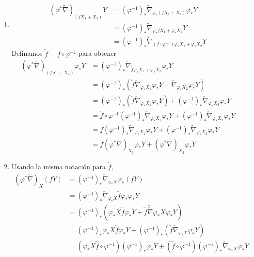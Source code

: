\documentclass[11pt]{article}
\begin{document}
\begin{enumerate}
    \item 
    \begin{align*}        (\varphi^*\widetilde{\nabla})_{(fX_1+X_2)}Y&=(\varphi^{-1})_*\widetilde{\nabla}_{\varphi_*(fX_1+X_2)}\varphi_*Y\\
     &=(\varphi^{-1})_*\widetilde{\nabla}_{\varphi_*fX_1+\varphi_*X_2}Y\\
     &=(\varphi^{-1})_*\widetilde{\nabla}_{(f\circ\varphi^{-1})\varphi_*X_1+\varphi_*X_2}Y
    \end{align*}
    Definamos $\tilde{f}=f\circ\varphi^{-1}$ para obtener
    \begin{align*}        (\varphi^*\widetilde{\nabla})_{(fX_1+X_2)}\varphi_*Y&=(\varphi^{-1})_*\widetilde{\nabla}_{\tilde{f}\varphi_*X_1+\varphi_*X_2}\varphi_*Y\\
    &=(\varphi^{-1})_*(\tilde{f}\widetilde{\nabla}_{\varphi_*X_1}\varphi_*Y+\widetilde{\nabla}_{\varphi_*X_2}\varphi_*Y)\\
    &=(\varphi^{-1})_*(\tilde{f}\widetilde{\nabla}_{\varphi_*X_1}\varphi_*Y)+(\varphi^{-1})_*\widetilde{\nabla}_{\varphi_*X_2}\varphi_*Y\\
    &=\tilde{f}\circ\varphi^{-1}(\varphi^{-1})_*\widetilde{\nabla}_{\varphi_*X_1}\varphi_*Y+(\varphi^{-1})_*\widetilde{\nabla}_{\varphi_*X_2}\varphi_*Y\\
    &=f(\varphi^{-1})_*\widetilde{\nabla}_{\varphi_*X_1}\varphi_*Y+(\varphi^{-1})_*\widetilde{\nabla}_{\varphi_*X_2}\varphi_*Y\\
    &=f(\varphi^*\widetilde{\nabla})_{X_1}\varphi_*Y+(\varphi^*\widetilde{\nabla})_{X_2}\varphi_*Y
    \end{align*}
\newpage
    \item Usando la misma notación para $\tilde{f}$,
    \begin{align*}       
		(\varphi^*\widetilde{\nabla})_{X}(fY)&=(\varphi^{-1})_*\widetilde{\nabla}_{\varphi_*X}\varphi_*(fY)\\
     &=(\varphi^{-1})_*\widetilde{\nabla}_{\varphi_*X}\tilde{f}\varphi_*\varphi_*Y\\
     &=(\varphi^{-1})_*\left( \varphi_*X\tilde{f}\varphi_*Y+\tilde{f}\widetilde{\widetilde{\nabla}}{\varphi_*X}\varphi_*Y\right)\\
     &=(\varphi^{-1})_*\varphi_*X\tilde{f}\varphi_*Y+(\varphi^{-1})_*(\tilde{f}\widetilde{\nabla}_{\varphi_*X}\varphi_*Y)\\
     &=(\varphi_*X\tilde{f}\circ\varphi^{-1})(\varphi^{-1})_*\varphi_*Y+(\tilde{f}\circ\varphi^{-1})(\varphi^{-1})_*\widetilde{\nabla}_{\varphi_*X}\varphi_*Y\\

\end{align*}
\end{enumerate}
\end{document}
